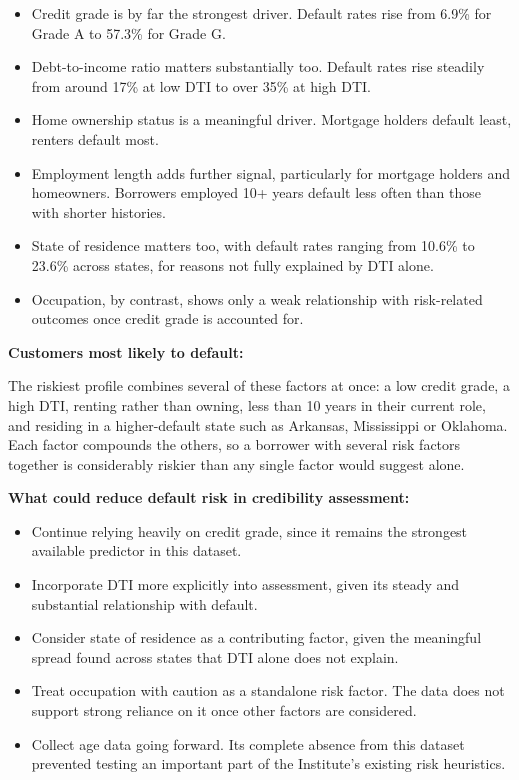 \documentclass[11pt,preprint]{elsarticle}
\numberwithin{equation}{section}
\numberwithin{figure}{section}
\numberwithin{table}{section}
\def\tightlist{} %
\begin{document}
\begin{itemize}
\tightlist
\item
  Credit grade is by far the strongest driver. Default rates rise from
  6.9\% for Grade A to 57.3\% for Grade G.
\item
  Debt-to-income ratio matters substantially too. Default rates rise
  steadily from around 17\% at low DTI to over 35\% at high DTI.
\item
  Home ownership status is a meaningful driver. Mortgage holders default
  least, renters default most.
\item
  Employment length adds further signal, particularly for mortgage
  holders and homeowners. Borrowers employed 10+ years default less
  often than those with shorter histories.
\item
  State of residence matters too, with default rates ranging from 10.6\%
  to 23.6\% across states, for reasons not fully explained by DTI alone.
\item
  Occupation, by contrast, shows only a weak relationship with
  risk-related outcomes once credit grade is accounted for.
\end{itemize}

\textbf{Customers most likely to default:}

The riskiest profile combines several of these factors at once: a low
credit grade, a high DTI, renting rather than owning, less than 10 years
in their current role, and residing in a higher-default state such as
Arkansas, Mississippi or Oklahoma. Each factor compounds the others, so
a borrower with several risk factors together is considerably riskier
than any single factor would suggest alone.

\textbf{What could reduce default risk in credibility assessment:}

\begin{itemize}
\tightlist
\item
  Continue relying heavily on credit grade, since it remains the
  strongest available predictor in this dataset.
\item
  Incorporate DTI more explicitly into assessment, given its steady and
  substantial relationship with default.
\item
  Consider state of residence as a contributing factor, given the
  meaningful spread found across states that DTI alone does not explain.
\item
  Treat occupation with caution as a standalone risk factor. The data
  does not support strong reliance on it once other factors are
  considered.
\item
  Collect age data going forward. Its complete absence from this dataset
  prevented testing an important part of the Institute's existing risk
  heuristics.
\end{itemize}


\end{document}

